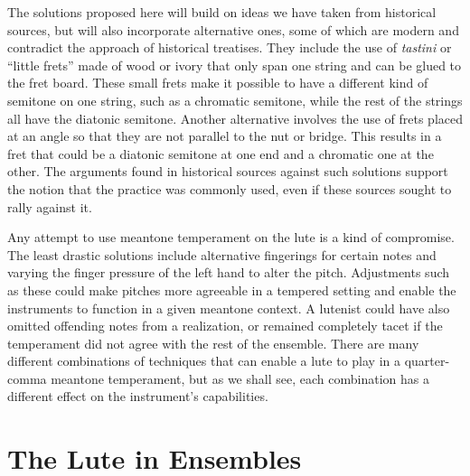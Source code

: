 The solutions proposed here will build on ideas we have taken from historical sources, but will also incorporate
alternative ones, some of which are modern and contradict the approach of historical treatises. They include the use of
\textit{tastini} or ``little frets'' made of wood or ivory that only span one string and can be glued to the fret board.
These small frets make it possible to have a different kind of semitone on one string, such as a chromatic semitone,
while the rest of the strings all have the diatonic semitone. Another alternative involves the use of frets placed at
an angle so that they are not parallel to the nut or bridge. This results in a fret that could be a diatonic semitone
at one end and a chromatic one at the other. The arguments found in historical sources against such solutions support
the notion that the practice was commonly used, even if these sources sought to rally against it.

Any attempt to use meantone temperament on the lute is a kind of compromise. The least drastic solutions include
alternative fingerings for certain notes and varying the finger pressure of the left hand to alter the pitch.
Adjustments such as these could make pitches more agreeable in a tempered setting and enable the instruments to function
in a given meantone context. A lutenist could have also omitted offending notes from a realization, or remained
completely tacet if the temperament did not agree with the rest of the ensemble. There are many different combinations
of techniques that can enable a lute to play in a quarter-comma meantone temperament, but as we shall see, each
combination has a different effect on the instrument's capabilities.

\section{The Lute in Ensembles}

